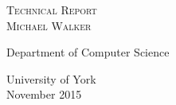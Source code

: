 \begin{titlepage}
\begin{center}

\textsc{\LARGE \dejafu{} Technical Report}\\[1.5cm]

\textsc{\large Michael Walker}\\[1,5cm]

\vfill

Department of Computer Science\par
University of York \\[1,3cm]

November 2015


\end{center}
\end{titlepage}